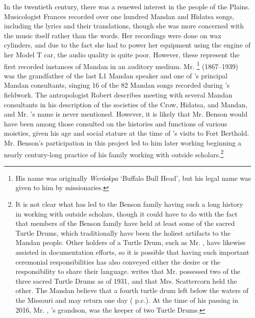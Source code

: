 In the twentieth century, there was a renewed interest in the people of the Plains. Musicologist Frances \citet{densmore1923} recorded over one hundred Mandan and Hidatsa songs, including the lyrics and their translations, though she was more concerned with the music itself rather than the words. Her recordings were done on wax cylinders, and due to the fact she had to power her equipment using the engine of her Model T car, the audio quality is quite poor. However, these represent the first recorded instances of Mandan in an auditory medium. Mr. \footnote{His name was originally \textit{Weróokpa} `Buffalo Bull Head', but his legal name was given to him by missionaries.} (1867--1939) was the grandfather of the last L1 Mandan speaker and one of \citeauthor{densmore1923}'s principal Mandan consultants, singing 16 of the 82 Mandan songs recorded during \citeauthor{densmore1923}'s fieldwork. The antropologist Robert \citet{lowie1913} describes meeting with several Mandan consultants in his description of the societies of the Crow, Hidatsa, and Mandan, and Mr. 's name is never mentioned. However, it is likely that Mr. Benson would have been among those consulted on the histories and functions of various moieties, given his age and social stature at the time of \citeauthor{lowie1913}'s visits to Fort Berthold. Mr. Benson's participation in this project led to him later working  beginning a nearly century-long practice of his family working with outside scholars.\footnote{It is not clear what has led to the Benson family having such a long history in working with outside scholars, though it could have to do with the fact that members of the Benson family have held at least some of the sacred Turtle Drums, which traditionally have been the holiest artifacts to the Mandan people. Other holders of a Turtle Drum, such as Mr. , have likewise assisted in documentation efforts, so it is possible that having such important ceremonial responsibilities has also conveyed either the desire or the responsibility to share their language. \citet[105]{bowers1950} writes that Mr.  possessed two of the three sacred Turtle Drums as of 1931, and that Mrs. Scattercorn held the other. The Mandan believe that a fourth turtle drum left below the waters of the Missouri and may return one day (\citeauthor{benson2000} p.c.). At the time of his passing in 2016, Mr. , 's grandson, was the keeper of two Turtle Drums.}

